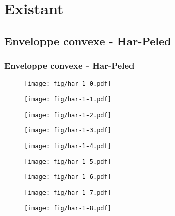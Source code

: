 \documentclass{beamer}
\begin{document}
\section{Existant}

\subsection{Enveloppe convexe - Har-Peled}
\begin{frame}
\frametitle{Enveloppe convexe - Har-Peled}

  {
    \begin{figure}[h!]
      \centering
      \texttt{[image: fig/har-1-0.pdf]}
    \end{figure}
  }
  {
    \begin{figure}[h!]
      \centering
      \texttt{[image: fig/har-1-1.pdf]}
    \end{figure}
  }
  {
    \begin{figure}[h!]
      \centering
      \texttt{[image: fig/har-1-2.pdf]}
    \end{figure}
  }
  {
    \begin{figure}[h!]
      \centering
      \texttt{[image: fig/har-1-3.pdf]}
    \end{figure}
  }
  {
    \begin{figure}[h!]
      \centering
      \texttt{[image: fig/har-1-4.pdf]}
    \end{figure}
  }
  {
    \begin{figure}[h!]
      \centering
      \texttt{[image: fig/har-1-5.pdf]}
    \end{figure}
  }
  {
    \begin{figure}[h!]
      \centering
      \texttt{[image: fig/har-1-6.pdf]}
    \end{figure}
  }
  {
    \begin{figure}[h!]
      \centering
      \texttt{[image: fig/har-1-7.pdf]}
    \end{figure}
  }
  {
    \begin{figure}[h!]
      \centering
      \texttt{[image: fig/har-1-8.pdf]}
    \end{figure}
  }   

\end{frame}
\end{document}
